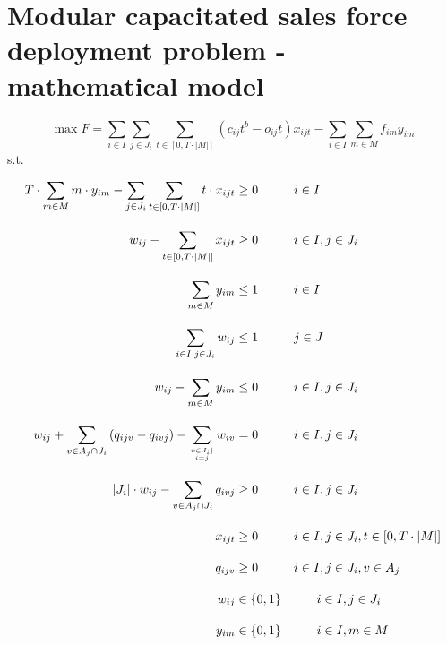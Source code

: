 \documentclass{article}
\begin{document}
\section{Modular capacitated sales force deployment problem - mathematical model}
 \vspace{4em}
\begin{equation}
     \max F = \sum_{i \in I} \sum_{j \in J_i} \sum_{t \in [0,T \cdot |M|]} (c_{ij}t^b - o_{ij}t)  x_{ijt} - \sum_{i \in I} \sum_{m \in M} f_{im} y_{im} \label{eq:obj}
\end{equation}
s.t.

\begin{align}
     T \cdot \sum_{m \in M}m \cdot y_{im} - \sum_{ j \in J_i} \sum_{t\in [0,T \cdot |M|]} t \cdot x_{ijt}  &\ge 0   \hspace*{1cm} i \in I \label{eq:timealloc} \\[1em]
     w_{ij} - \sum_{t \in \left[0,T \cdot |M| \right]}x_{ijt} &\ge 0  \hspace*{1cm} i \in I, j \in J_i  \\[1em]
     \sum_{m \in M} y_{im} &\le 1 \hspace*{1cm} i \in I \\[1em]
     \sum_{i \in I\mid j \in J_i} w_{ij}  & \le 1 \hspace*{1cm} j \in J \\[1em]
     w_{ij} - \sum_{m \in M} y_{im} &\le 0     \hspace*{1cm} i \in I,  j \in J_i \\[1em]
     w_{ij} + \sum_{v \in A_j \cap J_i} \left(q_{ijv} - q_{ivj} \right) - \sum_{v \in J_i \mid \atop i=j} w_{iv} &= 0  \hspace*{1cm} i \in I,  j \in J_i \\[1em]
     \left|J_i\right|\cdot w_{ij} - \sum_{v \in A_j \cap J_i} q_{ivj} &\geq 0  \hspace*{1cm} i \in I, j \in J_i \\[1em]
     x_{ijt} &\geq 0 \hspace*{1cm} i \in I, j \in J_i, t \in \left[0,T\cdot \left|M\right|\right] \\[1em]
     q_{ijv} &\geq 0 \hspace*{1cm} i \in I, j \in J_i, v \in A_j \\[1em]
     w_{ij} &\in \{0,1\} \hspace*{1cm} i \in I, j \in J_i \\[1em]
     y_{im} &\in \{0,1\} \hspace*{1cm} i \in I, m \in M \label{eq:yint}
\end{align}
\end{document}
